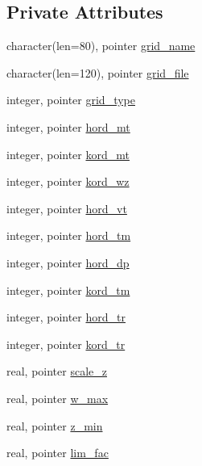 \subsection*{Private Attributes}
\begin{DoxyCompactItemize}
\item 
character(len=80), pointer \hyperlink{classfv__control__mod_ab4d0c803dedf251c5be32d99a5aa8c5d}{grid\-\_\-name}
\item 
character(len=120), pointer \hyperlink{classfv__control__mod_ab66042467e04279683c403c49e70d9a4}{grid\-\_\-file}
\item 
integer, pointer \hyperlink{classfv__control__mod_ab429e3c6b455d8f4b4a33bb0b38e3377}{grid\-\_\-type}
\item 
integer, pointer \hyperlink{classfv__control__mod_a9673087af927980ad41bce4c63ff0420}{hord\-\_\-mt}
\item 
integer, pointer \hyperlink{classfv__control__mod_a72331132938fe4e15a1476ea5e86c590}{kord\-\_\-mt}
\item 
integer, pointer \hyperlink{classfv__control__mod_a59c2ef1ff452aa8609a6f0adf8934196}{kord\-\_\-wz}
\item 
integer, pointer \hyperlink{classfv__control__mod_a8449a84c4d6a876356e036a171ee2b2c}{hord\-\_\-vt}
\item 
integer, pointer \hyperlink{classfv__control__mod_a1032a6ad00034e6a75dd9d652f8b8fb0}{hord\-\_\-tm}
\item 
integer, pointer \hyperlink{classfv__control__mod_ab43356c6c0ba965bb6e2c626c2d6b3a7}{hord\-\_\-dp}
\item 
integer, pointer \hyperlink{classfv__control__mod_a36c2bfe007d2c6556cf6908901a9c781}{kord\-\_\-tm}
\item 
integer, pointer \hyperlink{classfv__control__mod_adb56058680af2238e44abdd8e8881782}{hord\-\_\-tr}
\item 
integer, pointer \hyperlink{classfv__control__mod_ab086182327f3d6ab0b8c634608845252}{kord\-\_\-tr}
\item 
real, pointer \hyperlink{classfv__control__mod_a33331d1b80f42ac121c7e433ce110e4f}{scale\-\_\-z}
\item 
real, pointer \hyperlink{classfv__control__mod_a913483ee0df1ec846e1a3ebd4f8b183e}{w\-\_\-max}
\item 
real, pointer \hyperlink{classfv__control__mod_a65816317cf5d1265356c6373d64deecf}{z\-\_\-min}
\item 
real, pointer \hyperlink{classfv__control__mod_a47bfac3f007039bf56a2aea807ae6fc5}{lim\-\_\-fac}

\end{DoxyCompactItemize}
